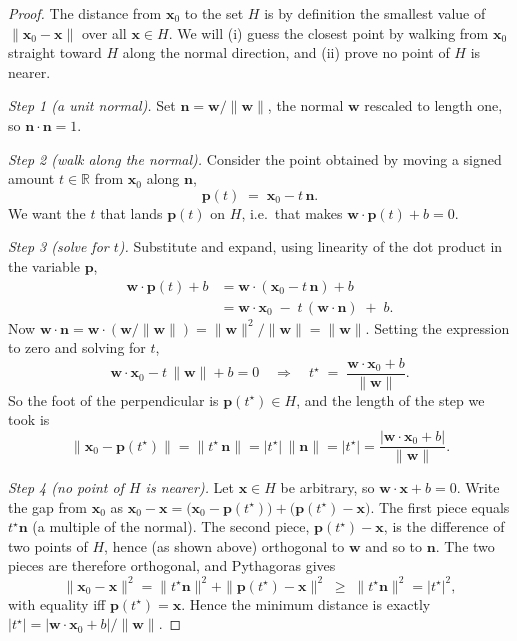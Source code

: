 \begin{proof}
The distance from $\mathbf{x}_0$ to the set $H$ is by definition the
smallest value of $\|\mathbf{x}_0 - \mathbf{x}\|$ over all
$\mathbf{x}\in H$. We will (i) guess the closest point by walking from
$\mathbf{x}_0$ straight toward $H$ along the normal direction, and
(ii) prove no point of $H$ is nearer.

\emph{Step 1 (a unit normal).}
Set $\mathbf{n} = \mathbf{w}/\|\mathbf{w}\|$, the normal $\mathbf{w}$
rescaled to length one, so $\mathbf{n}\cdot\mathbf{n} = 1$.

\emph{Step 2 (walk along the normal).}
Consider the point obtained by moving a signed amount $t\in\mathbb{R}$ from
$\mathbf{x}_0$ along $\mathbf{n}$,
\[
  \mathbf{p}(t) \;=\; \mathbf{x}_0 - t\,\mathbf{n}.
\]
We want the $t$ that lands $\mathbf{p}(t)$ on $H$, i.e.\ that makes
$\mathbf{w}\cdot\mathbf{p}(t)+b = 0$.

\emph{Step 3 (solve for $t$).}
Substitute and expand, using linearity of the dot product in the variable
$\mathbf{p}$,
\begin{align*}
  \mathbf{w}\cdot\mathbf{p}(t) + b
  &= \mathbf{w}\cdot(\mathbf{x}_0 - t\,\mathbf{n}) + b \\
  &= \mathbf{w}\cdot\mathbf{x}_0 \;-\; t\,(\mathbf{w}\cdot\mathbf{n}) \;+\; b.
\end{align*}
Now $\mathbf{w}\cdot\mathbf{n} = \mathbf{w}\cdot(\mathbf{w}/\|\mathbf{w}\|)
= \|\mathbf{w}\|^2/\|\mathbf{w}\| = \|\mathbf{w}\|$. Setting the expression
to zero and solving for $t$,
\[
  \mathbf{w}\cdot\mathbf{x}_0 - t\,\|\mathbf{w}\| + b = 0
  \quad\Longrightarrow\quad
  t^\star \;=\; \frac{\mathbf{w}\cdot\mathbf{x}_0 + b}{\|\mathbf{w}\|}.
\]
So the foot of the perpendicular is $\mathbf{p}(t^\star)\in H$, and the
length of the step we took is
\[
  \|\mathbf{x}_0 - \mathbf{p}(t^\star)\| = \|t^\star\,\mathbf{n}\|
  = |t^\star|\,\|\mathbf{n}\| = |t^\star|
  = \frac{|\mathbf{w}\cdot\mathbf{x}_0 + b|}{\|\mathbf{w}\|}.
\]

\emph{Step 4 (no point of $H$ is nearer).}
Let $\mathbf{x}\in H$ be arbitrary, so $\mathbf{w}\cdot\mathbf{x}+b = 0$.
Write the gap from $\mathbf{x}_0$ as
$\mathbf{x}_0 - \mathbf{x} = \big(\mathbf{x}_0-\mathbf{p}(t^\star)\big)
+ \big(\mathbf{p}(t^\star)-\mathbf{x}\big)$. The first piece equals
$t^\star\mathbf{n}$ (a multiple of the normal). The second piece,
$\mathbf{p}(t^\star)-\mathbf{x}$, is the difference of two points of $H$,
hence (as shown above) orthogonal to $\mathbf{w}$ and so to $\mathbf{n}$.
The two pieces are therefore orthogonal, and Pythagoras gives
\[
  \|\mathbf{x}_0 - \mathbf{x}\|^2
  = \|t^\star\mathbf{n}\|^2 + \|\mathbf{p}(t^\star)-\mathbf{x}\|^2
  \;\ge\; \|t^\star\mathbf{n}\|^2 = |t^\star|^2,
\]
with equality iff $\mathbf{p}(t^\star)=\mathbf{x}$. Hence the minimum
distance is exactly $|t^\star| = |\mathbf{w}\cdot\mathbf{x}_0+b|/\|\mathbf{w}\|$.
\end{proof}

